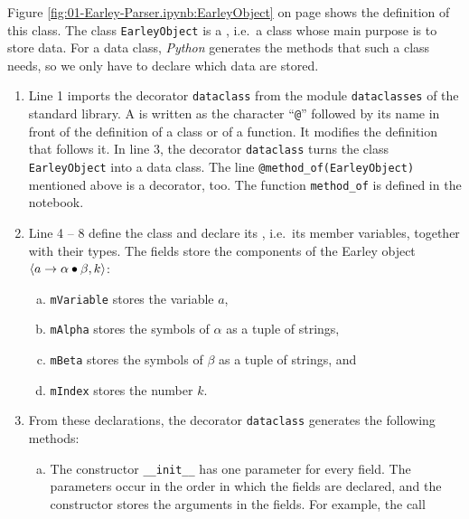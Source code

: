 \noindent
Figure \ref{fig:01-Earley-Parser.ipynb:EarleyObject} on page \pageref{fig:01-Earley-Parser.ipynb:EarleyObject} shows
the definition of this class.  The class \texttt{EarleyObject} is a , i.e.~a class
whose main purpose is to store data.  For a data class, \textsl{Python} generates the methods that such a class
needs, so we only have to declare which data are stored.
\begin{enumerate}
\item Line 1 imports the decorator \texttt{dataclass} from the module \texttt{dataclasses} of the standard library.
      A  is written as the character ``\texttt{@}'' followed by its name in front of
      the definition of a class or of a function.  It modifies the definition that follows it.  In line 3, the
      decorator \texttt{dataclass} turns the class \texttt{EarleyObject} into a data class.  The line
      \texttt{@method\_of(EarleyObject)} mentioned above is a decorator, too.  The function \texttt{method\_of} is
      defined in the notebook.
\item Line 4 -- 8 define the class and declare its , i.e.~its member
      variables, together with their types.  The fields store the components of the Earley object
      $\pair(a \rightarrow \alpha \mdot \beta, k)$:
      \begin{enumerate}[(a)]
      \item \texttt{mVariable} stores the variable $a$,
      \item \texttt{mAlpha} stores the symbols of $\alpha$ as a tuple of strings,
      \item \texttt{mBeta} stores the symbols of $\beta$ as a tuple of strings, and
      \item \texttt{mIndex} stores the number $k$.
      \end{enumerate}
\item From these declarations, the decorator \texttt{dataclass} generates the following methods:
      \begin{enumerate}[(a)]
      \item The constructor \texttt{\_\_init\_\_} has one parameter for every field.  The parameters occur in the
            order in which the fields are declared, and the constructor stores the arguments in the fields.  For
            example, the call
            \\[0.2cm]
            \hspace*{1.3cm}

\end{enumerate}
\end{enumerate}

